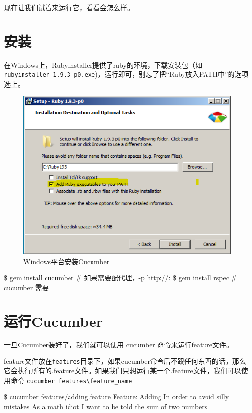 现在让我们试着来运行它，看看会怎么样。

\section{安装}
\label{安装}

在Windows上，RubyInstaller提供了ruby的环境，下载安装包（如\texttt{rubyinstaller-1.9.3-p0.exe})，运行即可，别忘了把“Ruby放入PATH中”的选项选上。

\begin{figure}[htbp]
\centering
\includegraphics[keepaspectratio,width=\textwidth,height=0.75\textheight]{img/18333fig0602-tn.png}
\caption{Windows平台安装Cucumber}
\end{figure}

\$ gem install cucumber \# 如果需要配代理，-p http:/\slash :
 \$ gem install rspec \# cucumber 需要

\section{运行Cucumber}
\label{运行cucumber}

一旦Cucumber装好了，我们就可以使用 cucumber 命令来运行feature文件。

feature文件放在\texttt{features}目录下，如果cucumber命令后不跟任何东西的话，那么它会执行所有的.feature文件。如果我们只想运行某一个.feature文件，我们可以使用命令 \texttt{cucumber features\textbackslash{}feature\_name}

\$ cucumber features\slash adding.feature
 Feature: Adding
 In order to avoid silly mistakes
 As a math idiot
 I want to be told the sum of two numbers

